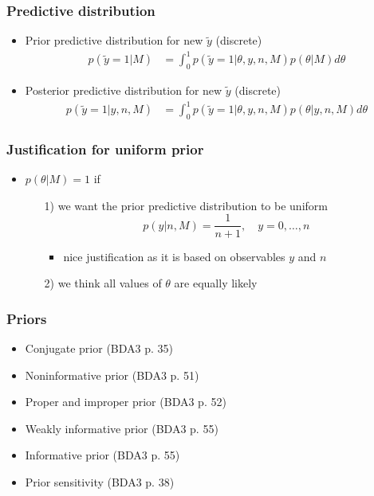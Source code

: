 \documentclass[english,t]{beamer}
\begin{document}
\begin{frame}
  \frametitle{Predictive distribution}

  \begin{itemize}
  \item Prior predictive distribution for new $\tilde{y}$ (discrete)
    \begin{align*}
      p(\tilde{y}=1|M) &= \int_0^1 p(\tilde{y}=1|\theta,y,n,M)p(\theta|M)d\theta
    \end{align*}
  \item Posterior predictive distribution for new $\tilde{y}$ (discrete)
    \begin{align*}
      p(\tilde{y}=1|y,n,M) &= \int_0^1 p(\tilde{y}=1|\theta,y,n,M)p(\theta|y,n,M)d\theta
    \end{align*}
  \end{itemize}
\end{frame}

\begin{frame}
  \frametitle{Justification for uniform prior}

  \begin{itemize}
  \item $p(\theta|M)=1$ if
    \begin{itemize}
    \item[1)] we want the prior predictive distribution to be uniform
      \begin{equation*}
        p(y|n,M) = \frac{1}{n+1}, \quad y=0,\ldots,n
      \end{equation*}
      \begin{itemize}
      \item nice justification as it is based on observables $y$ and $n$
      \end{itemize}
    \item[2)] we think all values of $\theta$ are equally likely
    \end{itemize} 
  \end{itemize}

\end{frame}

\begin{frame}
  \frametitle{Priors}

  \begin{itemize}
  \item Conjugate prior (BDA3 p. 35)
  \item Noninformative prior (BDA3 p. 51)
  \item Proper and improper prior (BDA3 p. 52)
  \item Weakly informative prior (BDA3 p. 55)
  \item Informative prior (BDA3 p. 55)
  \item Prior sensitivity (BDA3 p. 38)
  \end{itemize}

\end{frame}
\end{document}
